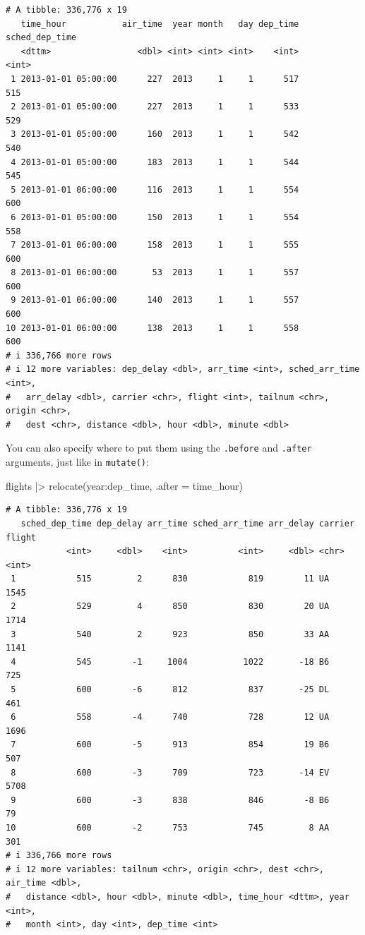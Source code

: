 \documentclass[
  letterpaper,
  DIV=11,
  numbers=noendperiod]{scrreprt}
\newenvironment{Shaded}{\begin{snugshade}}{\end{snugshade}}
\newcommand{\AttributeTok}[1]{\textcolor[rgb]{0.40,0.45,0.13}{#1}}
\newcommand{\FunctionTok}[1]{\textcolor[rgb]{0.28,0.35,0.67}{#1}}
\newcommand{\NormalTok}[1]{\textcolor[rgb]{0.00,0.23,0.31}{#1}}
\newcommand{\SpecialCharTok}[1]{\textcolor[rgb]{0.37,0.37,0.37}{#1}}
\begin{document}
\begin{verbatim}
# A tibble: 336,776 x 19
   time_hour           air_time  year month   day dep_time sched_dep_time
   <dttm>                 <dbl> <int> <int> <int>    <int>          <int>
 1 2013-01-01 05:00:00      227  2013     1     1      517            515
 2 2013-01-01 05:00:00      227  2013     1     1      533            529
 3 2013-01-01 05:00:00      160  2013     1     1      542            540
 4 2013-01-01 05:00:00      183  2013     1     1      544            545
 5 2013-01-01 06:00:00      116  2013     1     1      554            600
 6 2013-01-01 05:00:00      150  2013     1     1      554            558
 7 2013-01-01 06:00:00      158  2013     1     1      555            600
 8 2013-01-01 06:00:00       53  2013     1     1      557            600
 9 2013-01-01 06:00:00      140  2013     1     1      557            600
10 2013-01-01 06:00:00      138  2013     1     1      558            600
# i 336,766 more rows
# i 12 more variables: dep_delay <dbl>, arr_time <int>, sched_arr_time <int>,
#   arr_delay <dbl>, carrier <chr>, flight <int>, tailnum <chr>, origin <chr>,
#   dest <chr>, distance <dbl>, hour <dbl>, minute <dbl>
\end{verbatim}

You can also specify where to put them using the \texttt{.before} and
\texttt{.after} arguments, just like in \texttt{mutate()}:

\begin{Shaded}
\begin{Highlighting}[]
\NormalTok{flights }\SpecialCharTok{|\textgreater{}}
  \FunctionTok{relocate}\NormalTok{(year}\SpecialCharTok{:}\NormalTok{dep\_time, }\AttributeTok{.after =}\NormalTok{ time\_hour)}
\end{Highlighting}
\end{Shaded}

\begin{verbatim}
# A tibble: 336,776 x 19
   sched_dep_time dep_delay arr_time sched_arr_time arr_delay carrier flight
            <int>     <dbl>    <int>          <int>     <dbl> <chr>    <int>
 1            515         2      830            819        11 UA        1545
 2            529         4      850            830        20 UA        1714
 3            540         2      923            850        33 AA        1141
 4            545        -1     1004           1022       -18 B6         725
 5            600        -6      812            837       -25 DL         461
 6            558        -4      740            728        12 UA        1696
 7            600        -5      913            854        19 B6         507
 8            600        -3      709            723       -14 EV        5708
 9            600        -3      838            846        -8 B6          79
10            600        -2      753            745         8 AA         301
# i 336,766 more rows
# i 12 more variables: tailnum <chr>, origin <chr>, dest <chr>, air_time <dbl>,
#   distance <dbl>, hour <dbl>, minute <dbl>, time_hour <dttm>, year <int>,
#   month <int>, day <int>, dep_time <int>
\end{verbatim}
\end{document}
